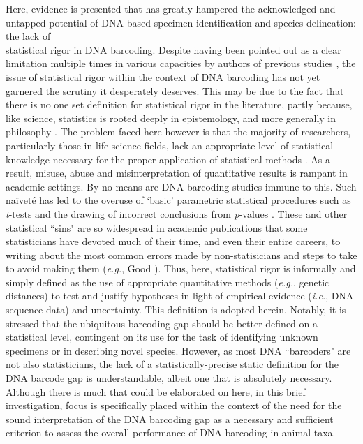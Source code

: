 Here, evidence is presented that has greatly hampered the acknowledged and untapped potential of DNA-based specimen identification and species delineation: the lack of \\ statistical rigor in DNA barcoding. Despite having been pointed out as a clear limitation multiple times in various capacities by authors of previous studies \cite{luo2015simulation, matz2005likelihood, nielsen2006statistical, phillips2019incomplete}, the issue of statistical rigor within the context of DNA barcoding has not yet garnered the scrutiny it desperately deserves.  This may be due to the fact that there is no one set definition for statistical rigor in the literature, partly because, like science, statistics is rooted deeply in epistemology, and more generally in philosophy \cite{lindley2000philosophy}. The problem faced here however is that the majority of researchers, particularly those in life science fields, lack an appropriate level of statistical knowledge necessary for the proper application of statistical methods \cite{fieberg2020resampling}. As a result, misuse, abuse and misinterpretation of quantitative results is rampant in academic settings. By no means are DNA barcoding studies immune to this. Such na{\"i}vet{\'e} has led to the overuse of `basic' parametric statistical procedures such as \textit{t}-tests and the drawing of incorrect conclusions from \textit{p}-values \cite{wasserstein2019moving}. These and other statistical ``sins" are so widespread in academic publications that some statisticians have devoted much of their time, and even their entire careers, to writing about the most common errors made by non-statisicians and steps to take to avoid making them (\textit{e.g.}, Good \cite{good2003common}). Thus, here, statistical rigor is informally and simply defined as the use of appropriate quantitative methods (\textit{e.g.}, genetic distances) to test and justify hypotheses in light of empirical evidence (\textit{i.e.}, DNA sequence data) and uncertainty. This definition is adopted herein. Notably, it is stressed that the ubiquitous barcoding gap should be better defined on a statistical level, contingent on its use for the task of identifying unknown specimens or in describing novel species. However, as most DNA ``barcoders" are not also statisticians, the lack of a statistically-precise static definition for the DNA barcode gap is understandable, albeit one that is absolutely necessary. Although there is much that could be elaborated on here, in this brief investigation, focus is specifically placed within the context of the need for the sound interpretation of the DNA barcoding gap as a necessary and sufficient criterion to assess the overall performance of DNA barcoding in animal taxa.



